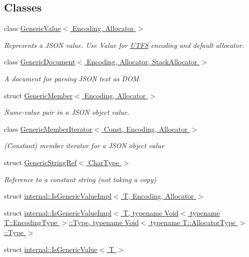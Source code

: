 \subsection*{Classes}
\begin{DoxyCompactItemize}
\item 
class \hyperlink{a01992}{Generic\+Value$<$ Encoding, Allocator $>$}
\begin{DoxyCompactList}\small\item\em Represents a J\+S\+ON value. Use Value for \hyperlink{a02144}{U\+T\+F8} encoding and default allocator. \end{DoxyCompactList}\item 
class \hyperlink{a01996}{Generic\+Document$<$ Encoding, Allocator, Stack\+Allocator $>$}
\begin{DoxyCompactList}\small\item\em A document for parsing J\+S\+ON text as D\+OM. \end{DoxyCompactList}\item 
struct \hyperlink{a02000}{Generic\+Member$<$ Encoding, Allocator $>$}
\begin{DoxyCompactList}\small\item\em Name-\/value pair in a J\+S\+ON object value. \end{DoxyCompactList}\item 
class \hyperlink{a02004}{Generic\+Member\+Iterator$<$ Const, Encoding, Allocator $>$}
\begin{DoxyCompactList}\small\item\em (Constant) member iterator for a J\+S\+ON object value \end{DoxyCompactList}\item 
struct \hyperlink{a02008}{Generic\+String\+Ref$<$ Char\+Type $>$}
\begin{DoxyCompactList}\small\item\em Reference to a constant string (not taking a copy) \end{DoxyCompactList}\item 
struct \hyperlink{a02012}{internal\+::\+Is\+Generic\+Value\+Impl$<$ T, Encoding, Allocator $>$}
\item 
struct \hyperlink{a02016}{internal\+::\+Is\+Generic\+Value\+Impl$<$ T, typename Void$<$ typename T\+::\+Encoding\+Type $>$\+::\+Type, typename Void$<$ typename T\+::\+Allocator\+Type $>$\+::\+Type $>$}
\item 
struct \hyperlink{a02020}{internal\+::\+Is\+Generic\+Value$<$ T $>$}
\item 

\end{DoxyCompactItemize}
